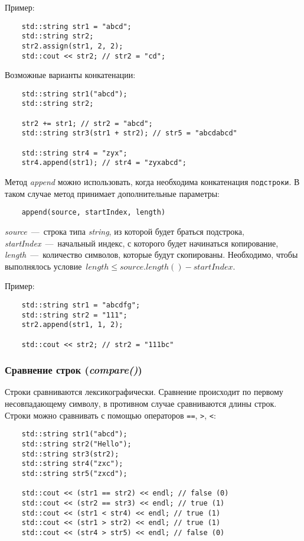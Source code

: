 Пример:
\begin{lstlisting}
    std::string str1 = "abcd";
    std::string str2;
    str2.assign(str1, 2, 2); 
    std::cout << str2; // str2 = "cd";
\end{lstlisting}

Возможные варианты конкатенации:
\begin{lstlisting}
    std::string str1("abcd");
    std::string str2;

    str2 += str1; // str2 = "abcd";
    std::string str3(str1 + str2); // str5 = "abcdabcd"

    std::string str4 = "zyx";
    str4.append(str1); // str4 = "zyxabcd";
\end{lstlisting}

Метод \textit{append} можно использовать, когда необходима конкатенация \texttt{подстроки}. В таком случае метод принимает дополнительные параметры:
\begin{lstlisting}
    append(source, startIndex, length)
\end{lstlisting}

\textit{source}~---~строка типа \textit{string}, из которой будет браться подстрока, \textit{startIndex}~---~начальный индекс, с которого будет начинаться копирование, \textit{length}~---~количество символов, которые будут скопированы. 
Необходимо, чтобы выполнялось условие~$length \leqslant source.length() - startIndex$.

Пример:
\begin{lstlisting}
    std::string str1 = "abcdfg";
    std::string str2 = "111";
    str2.append(str1, 1, 2);
    
    std::cout << str2; // str2 = "111bc"
\end{lstlisting}

\subsubsection{Сравнение строк (\textit{compare()})}
Строки сравниваются лексикографически. Сравнение происходит по первому несовпадающему символу, в противном случае сравниваются длины строк.
Строки можно сравнивать с помощью операторов \lstinline{==}, \lstinline{>}, \lstinline{<}:
\begin{lstlisting}
    std::string str1("abcd");
    std::string str2("Hello");
    std::string str3(str2);
    std::string str4("zxc");
    std::string str5("zxcd");
    
    std::cout << (str1 == str2) << endl; // false (0)
    std::cout << (str2 == str3) << endl; // true (1)
    std::cout << (str1 < str4) << endl; // true (1)
    std::cout << (str1 > str2) << endl; // true (1)
    std::cout << (str4 > str5) << endl; // false (0)
\end{lstlisting}

